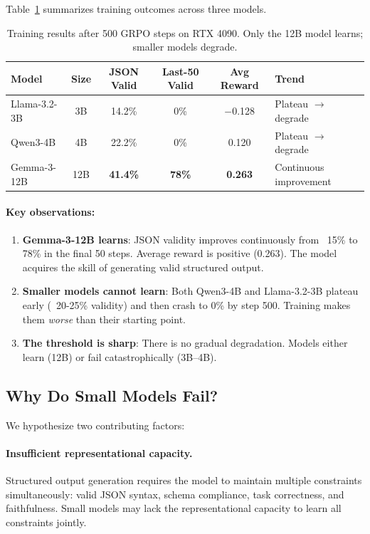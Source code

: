 \documentclass[11pt]{article}
\begin{document}
Table~\ref{tab:training-results} summarizes training outcomes across three models.

\begin{table}[t]
\centering
\caption{Training results after 500 GRPO steps on RTX 4090. Only the 12B model learns; smaller models degrade.}
\label{tab:training-results}
\begin{tabular}{lccccl}
\toprule
\textbf{Model} & \textbf{Size} & \textbf{JSON Valid} & \textbf{Last-50 Valid} & \textbf{Avg Reward} & \textbf{Trend} \\
\midrule
Llama-3.2-3B & 3B & 14.2\% & 0\% & $-$0.128 & Plateau $\rightarrow$ degrade \\
Qwen3-4B & 4B & 22.2\% & 0\% & 0.120 & Plateau $\rightarrow$ degrade \\
Gemma-3-12B & 12B & \textbf{41.4\%} & \textbf{78\%} & \textbf{0.263} & Continuous improvement \\
\bottomrule
\end{tabular}
\end{table}

\paragraph{Key observations:}

\begin{enumerate}[leftmargin=12pt]
    \item \textbf{Gemma-3-12B learns}: JSON validity improves continuously from ~15\% to 78\% in the final 50 steps. Average reward is positive (0.263). The model acquires the skill of generating valid structured output.

    \item \textbf{Smaller models cannot learn}: Both Qwen3-4B and Llama-3.2-3B plateau early (~20-25\% validity) and then crash to 0\% by step 500. Training makes them \emph{worse} than their starting point.

    \item \textbf{The threshold is sharp}: There is no gradual degradation. Models either learn (12B) or fail catastrophically (3B--4B).
\end{enumerate}

\subsection{Why Do Small Models Fail?}

We hypothesize two contributing factors:

\paragraph{Insufficient representational capacity.}
Structured output generation requires the model to maintain multiple constraints simultaneously: valid JSON syntax, schema compliance, task correctness, and faithfulness.
Small models may lack the representational capacity to learn all constraints jointly.
\end{document}
